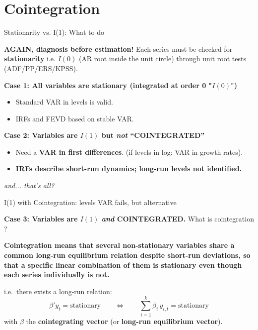 \documentclass{beamer}
\begin{document}
\section{Cointegration}

\begin{frame}{Stationarity vs. I(1): What to do}

\textbf{AGAIN, diagnosis before estimation!}
Each series must be checked for \textbf{stationarity} i.e. $I(0)$ (AR root inside the unit circle) through unit root tests (ADF/PP/ERS/KPSS). 

\bigskip

\textbf{Case 1: All variables are stationary (integrated at order 0 "$I(0)$")}
\begin{itemize}
    \item Standard VAR in levels is valid.
    \item IRFs and FEVD based on stable VAR.
\end{itemize}

\bigskip

\textbf{Case 2: Variables are $I(1)$ but \emph{not} ``COINTEGRATED''}
\begin{itemize}
    \item Need a \textbf{VAR in first differences}. (if levels in log: VAR in growth rates). 
    \item \textbf{IRFs describe short-run dynamics; long-run levels not identified.}
\end{itemize}
\bigskip
\textit{and... that's all? }

\end{frame}


\begin{frame}{I(1) with Cointegration: levels VAR fails, but alternative}

\textbf{Case 3: Variables are $I(1)$ \textit{and} COINTEGRATED.}
\smallskip
What is cointegration ? 
\pause
\smallskip
\begin{center}
\textbf{Cointegration means that several non-stationary variables share a common long-run equilibrium relation despite short-run deviations, so that a specific linear combination of them is stationary even though each series individually is not.}
\end{center}
\pause
i.e.\ there exists a long-run relation:
\[
\beta' y_t = \text{stationary}
\qquad\Longleftrightarrow\qquad
\sum_{i=1}^k \beta_i\, y_{i,t} = \text{stationary}
\]
with $\beta$ the \textbf{cointegrating vector} (or \textbf{long-run equilibrium vector}). 
\end{frame}
\end{document}
